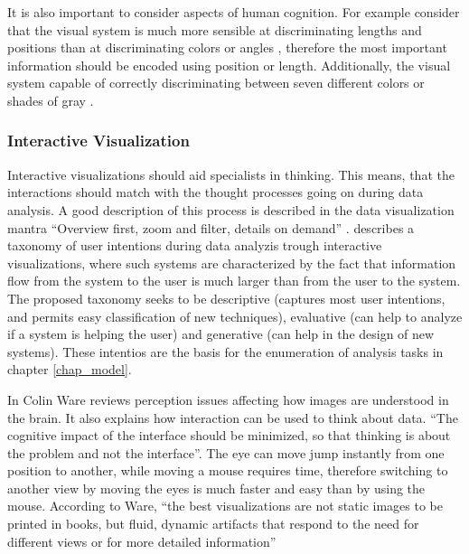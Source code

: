 It is also important to consider aspects of human cognition. For example consider that the visual system is much more sensible at discriminating lengths and positions than at discriminating colors or angles \autocite{ware_information_2004}, therefore the most important information should be encoded using position or length. Additionally, the visual system capable of correctly discriminating between seven different colors or shades of gray \autocite{miller_magical_1956}.




\subsubsection{Interactive Visualization}

Interactive visualizations should aid specialists in thinking. This means, that the interactions should match with the thought processes going on during data analysis. A good description of this process is described in the data visualization mantra ``Overview first, zoom and filter, details on demand'' \autocite{schneiderman_designing_1998}. \autocite{yi_toward_2007} describes a taxonomy of user intentions during data analyzis trough interactive visualizations, where such systems are characterized by the fact that information flow from the system to the user is much larger than from the user to the system. The proposed taxonomy seeks to be descriptive (captures most user intentions, and permits easy classification of new techniques), evaluative (can help to analyze if a system is helping the user) and generative (can help in the design of new systems). These intentios are the basis for the enumeration of analysis tasks in chapter \ref{chap_model}.

In \autocite{ware_information_2004} Colin Ware reviews perception issues affecting how images are understood in the brain. It also explains how interaction can be used to think about data.  ``The cognitive impact of the interface should be minimized, so that thinking is about the problem and not the interface''. The eye can move jump instantly from one position to another, while moving a mouse requires time, therefore switching to another view by moving the eyes is much faster and easy than by using the mouse. According to Ware, ``the best visualizations are not static images to be printed in books, but fluid, dynamic artifacts that respond to the need for different views or for more detailed information''

